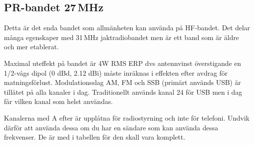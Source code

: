 \subsection{PR-bandet 27\,MHz}

Detta är det enda bandet som allmänheten kan använda på HF-bandet. Det delar många egenskaper med 31\,MHz jaktradiobandet men är ett band som är äldre och mer etablerat.

Maximal uteffekt på bandet är 4W RMS ERP dvs antennvinst överstigande en 1/2-vågs dipol (0 dBd, 2.12 dBi) måste inräknas i effekten efter avdrag för matningsförlust. Modulationsslag AM, FM och SSB (primärt används USB) är tillåtet på alla kanaler i dag. Traditionellt används kanal 24 för USB men i dag får vilken kanal som helst användas.

Kanalerna med A efter är upplåtna för radiostyrning och inte för telefoni. Undvik därför att använda dessa om du har en sändare som kan använda dessa frekvenser. De är med i tabellen för den skall vara komplett. 

\clearpage

